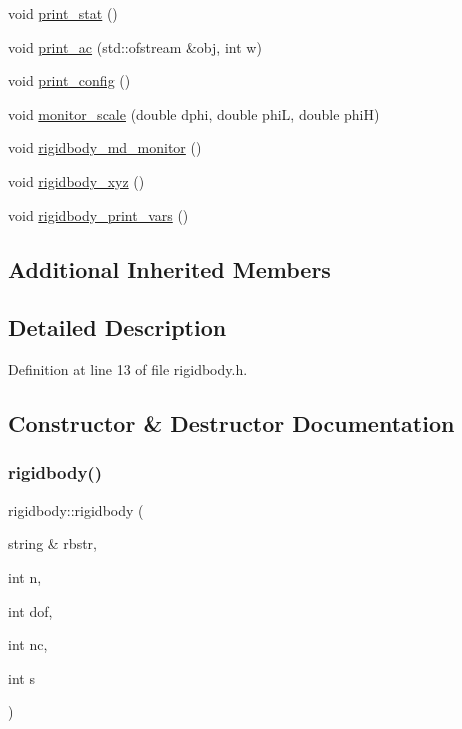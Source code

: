 \begin{DoxyCompactItemize}
void \mbox{\hyperlink{classrigidbody_aa00fc3768317e6852643a37cbe19c76a}{print\+\_\+stat}} ()
\item 
void \mbox{\hyperlink{classrigidbody_a24ffb7711348dc2813b8c07e899d065f}{print\+\_\+ac}} (std\+::ofstream \&obj, int w)
\item 
void \mbox{\hyperlink{classrigidbody_aa486e3fa6409f5031188193e37eadc10}{print\+\_\+config}} ()
\item 
void \mbox{\hyperlink{classrigidbody_aecb6c9283be568ba2c303d82d174d987}{monitor\+\_\+scale}} (double dphi, double phiL, double phiH)
\item 
void \mbox{\hyperlink{classrigidbody_a0af56b5a8e3c6550c9a45b6a59c262ef}{rigidbody\+\_\+md\+\_\+monitor}} ()
\item 
void \mbox{\hyperlink{classrigidbody_a05123548826f40f3737bd9f0fce21a85}{rigidbody\+\_\+xyz}} ()
\item 
void \mbox{\hyperlink{classrigidbody_ae7af1f93b40b47c9e855bcb0adb74434}{rigidbody\+\_\+print\+\_\+vars}} ()
\end{DoxyCompactItemize}
\subsection*{Additional Inherited Members}


\subsection{Detailed Description}


Definition at line 13 of file rigidbody.\+h.



\subsection{Constructor \& Destructor Documentation}
\mbox{\label{classrigidbody_a2d1f12365075606f81a18c3ce9454246}} 
\subsubsection{\texorpdfstring{rigidbody()}{rigidbody()}}
{\footnotesize\ttfamily rigidbody\+::rigidbody (\begin{DoxyParamCaption}\item[{string \&}]{rbstr,  }\item[{int}]{n,  }\item[{int}]{dof,  }\item[{int}]{nc,  }\item[{int}]{s }\end{DoxyParamCaption})}



